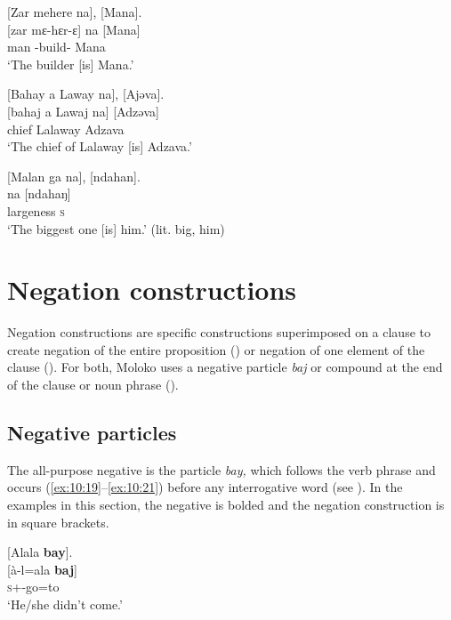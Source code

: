 \ea \label{ex:10:16}
{}[Zar  mehere   na],  [Mana].\\
\gll  {}[zar    mɛ-hɛr-ɛ]    na  [Mana]\\
      man   {\NOM}{}-build-{\CL}   {\PSP}  Mana\\
\glt  ‘The builder [is] Mana.’ 
\z

\ea \label{ex:10:17}
{}[Bahay  a  Laway  na],  [Ajəva].\\
\gll  {}[bahaj   a   Lawaj     na]  [Adzəva]\\
      chief  {\GEN}  Lalaway    {\PSP}  Adzava\\
\glt  ‘The chief of Lalaway [is] Adzava.’
\z

\ea \label{ex:10:18}
{}[Malan  ga   na],  [ndahan].\\
\gll  [malaŋ   ga]    na  [ndahaŋ]\\
      largeness  {\ADJ}    {\PSP}  \textsc{s}\\
\glt  ‘The biggest one [is] him.’ (lit. big, him)
\z

\section{Negation constructions}\label{sec:10.2}
\hypertarget{RefHeading1212901525720847}{}
Negation constructions are specific constructions superimposed on a clause to create negation of the entire proposition () or negation of one element of the clause (). For both, Moloko uses a negative particle \textit{baj} or compound at the end of the clause or noun phrase ().

\subsection{Negative particles}\label{sec:10.2.1}
\hypertarget{RefHeading1212921525720847}{}
The all-purpose negative is the particle \textit{bay,} which follows the verb phrase and occurs (\ref{ex:10:19}--\ref{ex:10:21}) before any interrogative word (see ). In the examples in this section, the negative is bolded and the negation construction is in square brackets. 

\ea \label{ex:10:19}
{}[Alala  \textbf{bay}].\\
\gll  {}[à-l=ala    \textbf{baj}]\\
      \textsc{s}+{\PFV}-go=to    {\NEG}\\
\glt  ‘He/she didn’t come.’
\z

